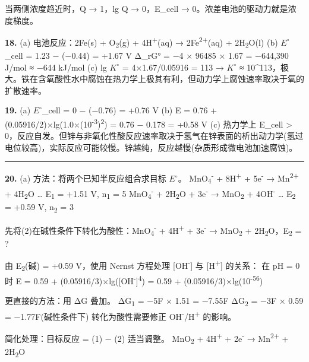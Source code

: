 当两侧浓度趋近时，Q → 1，lg Q → 0，E\_cell → 0。浓差电池的驱动力就是浓度梯度。

\textbf{18.}
(a) 电池反应：2Fe(s) + O\textsubscript{2}(g) + 4H\textsuperscript{+}(aq) → 2Fe\textsuperscript{2+}(aq) + 2H\textsubscript{2}O(l)
(b) \(E^{\circ}\)\_cell = 1.23 − (−0.44) = +1.67 V
Δ\_rG° = −4 × 96485 × 1.67 = −644,390 J/mol ≈ −644 kJ/mol
(c) lg \(K^{\circ}\) = 4×1.67/0.05916 = 113 → \(K^{\circ}\) ≈ 10\^{}113，极大。铁在含氧酸性水中腐蚀在热力学上极其有利，但动力学上腐蚀速率取决于氧的扩散速率。

\textbf{19.}
(a) \(E^{\circ}\)\_cell = 0 − (−0.76) = +0.76 V
(b) E = 0.76 + (0.05916/2)×lg(1.0×(10\textsuperscript{-3})\textsuperscript{2}) = 0.76 − 0.178 = +0.58 V
(c) 热力学上 E\_cell \textgreater{} 0，反应自发。但锌与非氧化性酸反应速率取决于氢气在锌表面的析出动力学(氢过电位较高)，实际反应可能较慢。锌越纯，反应越慢(杂质形成微电池加速腐蚀)。

\begin{center}\rule{0.5\linewidth}{0.5pt}\end{center}

\textbf{20.}
(a) 方法：将两个已知半反应组合求目标 \(E^{\circ}\)。
MnO\textsubscript{4}\textsuperscript{-} + 8H\textsuperscript{+} + 5e\textsuperscript{-} → Mn\textsuperscript{2+} + 4H\textsubscript{2}O \ldots{} E\textsubscript{1} = +1.51 V, n\textsubscript{1} = 5
MnO\textsubscript{4}\textsuperscript{-} + 2H\textsubscript{2}O + 3e\textsuperscript{-} → MnO\textsubscript{2} + 4OH\textsuperscript{-} \ldots{} E\textsubscript{2} = +0.59 V, n\textsubscript{2} = 3

先将(2)在碱性条件下转化为酸性：MnO\textsubscript{4}\textsuperscript{-} + 4H\textsuperscript{+} + 3e\textsuperscript{-} → MnO\textsubscript{2} + 2H\textsubscript{2}O，E\textsubscript{2} = ?

由 E\textsubscript{2}(碱) = +0.59 V，使用 Nernst 方程处理 {[}OH\textsuperscript{-}{]} 与 {[}H\textsuperscript{+}{]} 的关系：
在 pH = 0 时 E = 0.59 + (0.05916/3)×lg({[}OH\textsuperscript{-}{]}\textsuperscript{4}) = 0.59 + (0.05916/3)×lg(10\textsuperscript{-56})

更直接的方法：用 ΔG 叠加。
ΔG\textsubscript{1} = −5F × 1.51 = −7.55F
ΔG\textsubscript{2} = −3F × 0.59 = −1.77F(碱性条件下)
转化为酸性需要修正 OH\textsuperscript{-}/H\textsuperscript{+} 的影响。

简化处理：目标反应 = (1) − (2) 适当调整。
MnO\textsubscript{2} + 4H\textsuperscript{+} + 2e\textsuperscript{-} → Mn\textsuperscript{2+} + 2H\textsubscript{2}O

